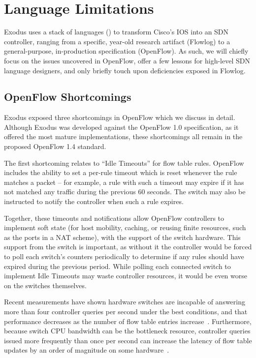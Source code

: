 \section{Language Limitations}

Exodus uses a stack of languages (\cf {}) to transform Cisco's IOS into
an SDN controller, ranging from a specific, year-old research artifact (Flowlog) to
a general-purpose, in-production specification (OpenFlow). As such, we will chiefly focus on the
issues uncovered in OpenFlow, offer a few lessons for high-level SDN language designers,
and only briefly touch upon deficiencies exposed in Flowlog.

\subsection{OpenFlow Shortcomings}

Exodus exposed three shortcomings in OpenFlow which we discuss in detail.
Although Exodus was developed against the OpenFlow 1.0 specification, as it
offered the most mature implementations, these shortcomings all remain in the
proposed OpenFlow 1.4 standard.

The first shortcoming relates to ``Idle Timeouts'' for flow table rules.
OpenFlow includes the ability to set a per-rule timeout which is reset whenever
the rule matches a packet -- for example, a rule with such a timeout may
expire if it has not matched any traffic during the previous 60 seconds.
The switch may also be instructed to notify the controller when such a
rule expires.

Together, these timeouts and notifications allow OpenFlow controllers to
implement soft state (for host mobility, caching, or reusing finite resources, such
as the ports in a NAT scheme), with the support of the switch hardware.
This support from the switch is important, as without it the controller would
be forced to poll each switch's counters periodically to determine if any rules
should have expired during the previous period.
While polling each connected switch to implement Idle Timeouts may
waste controller resources, it would be even worse on the switches themselves.

Recent measurements have shown hardware switches are
incapable of answering more than four controller queries per second under
the best conditions, and that performance decreases as the number of flow table
entries increase~\cite{Curtis:2011devoflow,Rotsos:2012oflops}.
Furthermore, because switch CPU bandwidth can be the bottleneck resource,
controller queries issued more frequently than once per second can increase the
latency of flow table updates by an order of magnitude on some hardware~\cite{Rotsos:2012oflops}.


